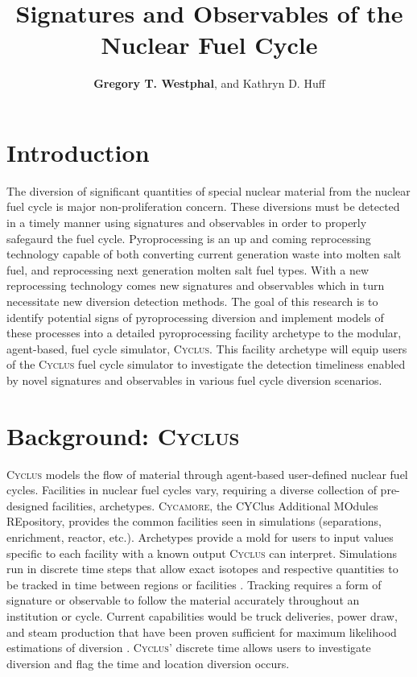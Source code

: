 \documentclass{anstrans}
\title{Signatures and Observables of the Nuclear Fuel Cycle}
\author{\textbf{Gregory T. Westphal}, and Kathryn D. Huff}
\institute{
Dept. of Nuclear, Plasma and Radiological Engineering, University of Illinois at Urbana-Champaign \\
gtw2@illinois.edu
}
\newcommand{\Cyclus}{\textsc{Cyclus}\xspace}%
\newcommand{\Cycamore}{\textsc{Cycamore}\xspace}%
\begin{document}
\section{Introduction}
The diversion of significant quantities of special nuclear material from the nuclear fuel cycle is major non-proliferation concern. These diversions must be detected in a timely manner using signatures and observables in order to properly safegaurd the fuel cycle. Pyroprocessing is an up and coming reprocessing technology capable of both converting current generation waste into molten salt fuel, and reprocessing next generation molten salt fuel types. With a new reprocessing technology comes new signatures and observables which in turn necessitate new diversion detection methods. The goal of this research is to identify potential signs of pyroprocessing diversion and implement models of these processes into a detailed pyroprocessing facility archetype to the modular, agent-based, fuel cycle simulator, \Cyclus. This facility archetype will equip users of the \Cyclus fuel cycle simulator to investigate the detection timeliness enabled by novel signatures and observables in various fuel cycle diversion scenarios.

\section{Background: \Cyclus}
\Cyclus models the flow of material through agent-based user-defined nuclear fuel cycles. Facilities in nuclear fuel cycles vary, requiring a diverse collection of pre-designed facilities, archetypes. \Cycamore, the CYClus Additional MOdules REpository, provides the common facilities seen in simulations (separations, enrichment, reactor, etc.). Archetypes provide a mold for users to input values specific to each facility with a known output \Cyclus can interpret. Simulations run in discrete time steps that allow exact isotopes and respective quantities to be tracked in time between regions or facilities \cite{huff_fundamental_2016}. Tracking requires a form of signature or observable to follow the material accurately throughout an institution or cycle. Current capabilities would be truck deliveries, power draw, and steam production that have been proven sufficient for maximum likelihood estimations of diversion \cite{Hou_2016,Yilmaz_2016}.
\Cyclus' discrete time allows users to investigate diversion and flag the time and location diversion occurs.
\end{document}

